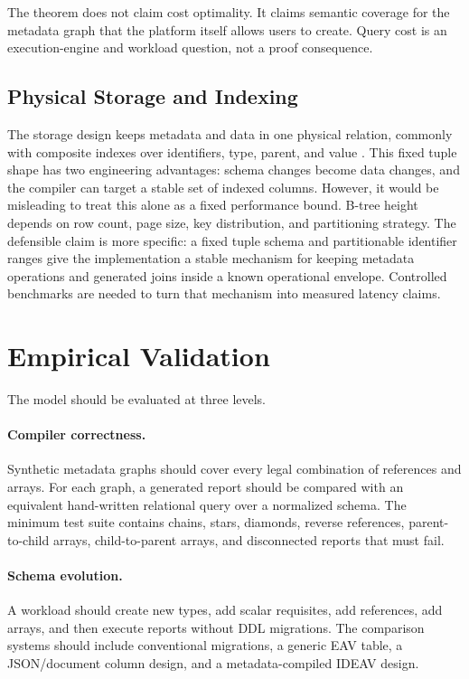 \documentclass[11pt]{article}
\begin{document}
The theorem does not claim cost optimality. It claims semantic coverage for the
metadata graph that the platform itself allows users to create. Query cost is an
execution-engine and workload question, not a proof consequence.

\subsection{Physical Storage and Indexing}

The storage design keeps metadata and data in one physical relation, commonly
with composite indexes over identifiers, type, parent, and value
\citep{integramWorkflow2026}. This fixed tuple shape has two engineering
advantages: schema changes become data changes, and the compiler can target a
stable set of indexed columns. However, it would be misleading to treat this
alone as a fixed performance bound. B-tree height depends on row count, page
size, key distribution, and partitioning strategy. The defensible claim is
more specific: a fixed tuple schema and partitionable identifier ranges give the
implementation a stable mechanism for keeping metadata operations and generated
joins inside a known operational envelope. Controlled benchmarks are needed to
turn that mechanism into measured latency claims.

\section{Empirical Validation}

The model should be evaluated at three levels.

\paragraph{Compiler correctness.}
Synthetic metadata graphs should cover every legal combination of references and
arrays. For each graph, a generated report should be compared with an equivalent
hand-written relational query over a normalized schema. The minimum test suite
contains chains, stars, diamonds, reverse references, parent-to-child arrays,
child-to-parent arrays, and disconnected reports that must fail.

\paragraph{Schema evolution.}
A workload should create new types, add scalar requisites, add references, add
arrays, and then execute reports without DDL migrations. The comparison systems
should include conventional migrations, a generic EAV table, a JSON/document
column design, and a metadata-compiled IDEAV design.
\end{document}

